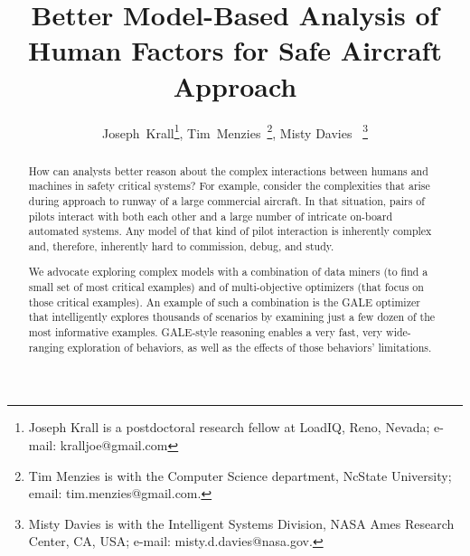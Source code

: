 \documentclass[journal]{IEEEtran}
\begin{document}
\title{Better Model-Based Analysis of\\ Human Factors for Safe Aircraft Approach}


\author{Joseph~Krall\thanks{Joseph Krall  
is a postdoctoral research fellow at LoadIQ, Reno, Nevada;
e-mail: kralljoe@gmail.com}, %
Tim~Menzies~\thanks{Tim Menzies is with the Computer Science department, NcState University; email:  tim.menzies@gmail.com.}, %
Misty Davies~
\thanks{
Misty Davies is with the Intelligent Systems Division,
NASA Ames Research Center, CA, USA;
e-mail:
misty.d.davies@nasa.gov.}
}

\maketitle
\begin{abstract}


How can analysts better reason about the complex interactions between humans and machines in safety critical systems? 
For example, consider the complexities that arise during approach to runway of
a large commercial aircraft. 
In that situation, pairs of pilots interact with both each other and a
large number of intricate on-board automated systems.  
Any model of that kind of pilot interaction is inherently complex and, therefore, inherently hard to commission, debug, and study.

We advocate exploring  complex models with a combination of data miners (to find a small set of most critical examples) and of multi-objective optimizers (that focus on  those critical examples). 
An example of such a combination is the GALE optimizer that intelligently explores thousands of scenarios by examining just a few dozen of the most informative examples.  
GALE-style reasoning enables a very fast, very wide-ranging exploration of behaviors, as well as the effects of those behaviors' limitations.




\end{abstract}
\end{document}
